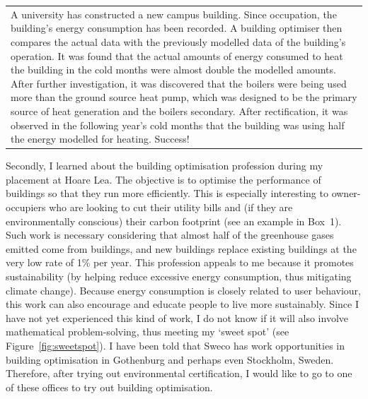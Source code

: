 \begin{table}
	\begin{tabular}{|p{}|}
		\hline
		\rowcolor[HTML]{F8A102} 
		\multicolumn{1}{|c|}{\cellcolor[HTML]{F8A102}\textbf{Box 1. An example of building optimisation}} \\ \hline
		A university has constructed a new campus building. Since occupation, the building's energy consumption has been recorded. A building optimiser then compares the actual data with the previously modelled data of the building's operation. It was found that the actual amounts of energy consumed to heat the building in the cold months were almost double the modelled amounts. After further investigation, it was discovered that the boilers were being used more than the ground source heat pump, which was designed to be the primary source of heat generation and the boilers secondary. After rectification, it was observed in the following year's cold months that the building was using half the energy modelled for heating. Success! \\ \hline
	\end{tabular}
\end{table}


Secondly, I learned about the building optimisation profession during my placement at Hoare Lea.
The objective is to optimise the performance of buildings so that they run more efficiently.
This is especially interesting to owner-occupiers who are looking to cut their utility bills and (if they are environmentally conscious) their carbon footprint (see an example in Box~1).
Such work is necessary considering that almost half of the greenhouse gases emitted come from buildings, and new buildings replace existing buildings at the very low rate of 1\% per year.
This profession appeals to me because it promotes sustainability (by helping reduce excessive energy consumption, thus mitigating climate change).
Because energy consumption is closely related to user behaviour, this work can also encourage and educate people to live more sustainably.
Since I have not yet experienced this kind of work, I do not know if it will also involve mathematical problem-solving, thus meeting my `sweet spot' (see Figure~\ref{fig:sweetspot}).
I have been told that Sweco has work opportunities in building optimisation in Gothenburg and perhaps even Stockholm, Sweden.
Therefore, after trying out environmental certification, I would like to go to one of these offices to try out building optimisation.

